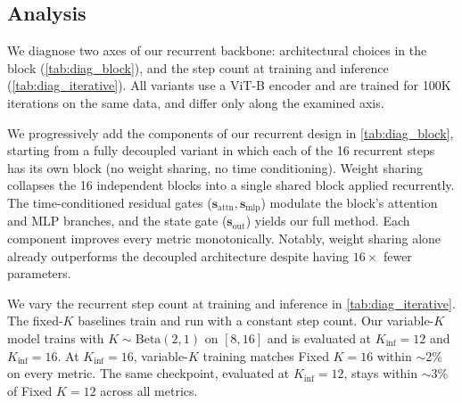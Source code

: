 


\subsection{Analysis}
\label{sec:analysis}

We diagnose two axes of our recurrent backbone: architectural choices in the block (\cref{tab:diag_block}), and the step count at training and inference (\cref{tab:diag_iterative}).
All variants use a ViT-B encoder and are trained for 100K iterations on the same data, and differ only along the examined axis.


We progressively add the components of our recurrent design in \cref{tab:diag_block}, starting from a fully decoupled variant in which each of the 16 recurrent steps has its own block (no weight sharing, no time conditioning).
Weight sharing collapses the 16 independent blocks into a single shared block applied recurrently. The time-conditioned residual gates ($\mathbf{s}_\text{attn}, \mathbf{s}_\text{mlp}$) modulate the block's attention and MLP branches, and the state gate ($\mathbf{s}_\text{out}$) yields our full method.
Each component improves every metric monotonically. Notably, weight sharing alone already outperforms the decoupled architecture despite having $16{\times}$ fewer parameters.


We vary the recurrent step count at training and inference in \cref{tab:diag_iterative}. The fixed-$K$ baselines train and run with a constant step count. Our variable-$K$ model trains with $K \sim \text{Beta}(2, 1)$ on $[8, 16]$ and is evaluated at $K_\text{inf}{=}12$ and $K_\text{inf}{=}16$.
At $K_\text{inf}{=}16$, variable-$K$ training matches Fixed $K{=}16$ within $\sim$2\% on every metric. The same checkpoint, evaluated at $K_\text{inf}{=}12$, stays within $\sim$3\% of Fixed $K{=}12$ across all metrics.















